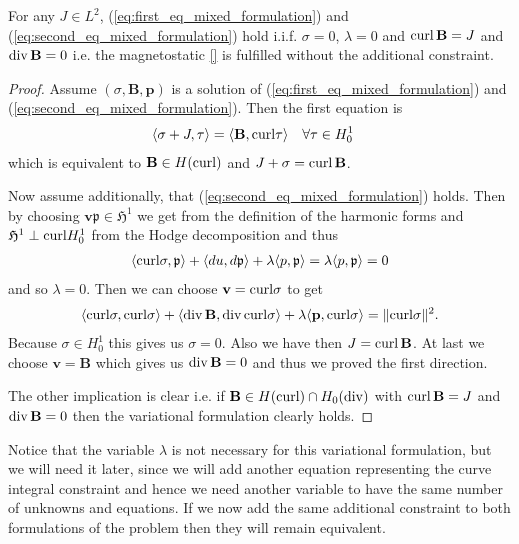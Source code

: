 \documentclass[../master_thesis.tex]{subfiles}
\begin{document}
\begin{proposition}
    For any $J \in L^2$, (\ref{eq:first_eq_mixed_formulation}) and 
    (\ref{eq:second_eq_mixed_formulation}) hold i.i.f. 
    $\sigma = 0$, $\lambda=0$ and $\operatorname{curl} \mathbf{B} = J$ and 
    $\operatorname{div} \mathbf{B} = 0$
    i.e. the magnetostatic \ref{}  is fulfilled without the additional 
    constraint.
\end{proposition}
\begin{proof}
    Assume $(\sigma,\mathbf{B},\mathbf{p})$ is a solution of (\ref{eq:first_eq_mixed_formulation}) and 
    (\ref{eq:second_eq_mixed_formulation}). Then the first equation is
    \begin{align*}
        \langle \sigma + J, \tau \rangle  
        &=  \langle \mathbf{B}, \mathbf{\operatorname{curl}}\tau \rangle  \quad \forall \tau \in H^1_0
    \end{align*}
    which is equivalent to $\mathbf{B} \in H(\operatorname{curl})$ and $J + \sigma = \operatorname{curl} \mathbf{B}$.

    Now assume additionally, that  
    (\ref{eq:second_eq_mixed_formulation}) holds. Then by choosing $\mathbf{v} \mathfrak{p} \in \mathfrak{H}^1$
    we get from the definition of the harmonic forms 
    and $\mathfrak{H}^1 \perp \mathbf{\operatorname{curl}} H^1_0$ from the Hodge decomposition and thus
    \begin{align*}
        \langle \mathbf{\operatorname{curl}} \sigma, \mathfrak{p} \rangle + \langle du, d\mathfrak{p} \rangle + \lambda\langle p, \mathfrak{p} \rangle
        = \lambda \langle p, \mathfrak{p} \rangle = 0
    \end{align*}
    and so $\lambda = 0$. Then we can choose $\mathbf{v} = \mathbf{\operatorname{curl}} \sigma$ to get 
    \begin{align*}
        \langle \mathbf{\operatorname{curl}} \sigma, \mathbf{\operatorname{curl}} \sigma \rangle + \langle \operatorname{div} \mathbf{B}, \operatorname{div} \mathbf{\operatorname{curl}} \sigma \rangle 
            + \lambda \langle \mathbf{p}, \mathbf{\operatorname{curl}} \sigma \rangle
        = \lVert \mathbf{\operatorname{curl}} \sigma \rVert^2.
    \end{align*}
    Because $\sigma \in H^1_0$ this gives us $\sigma = 0$. Also we have then 
    $J = \operatorname{curl} \mathbf{B}$. At last we choose $\mathbf{v} = \mathbf{B}$ which gives us 
    $\operatorname{div} \mathbf{B} = 0$ and thus we proved the first direction. 

    The other implication is clear i.e. if $\mathbf{B} \in H(\operatorname{curl}) \cap H_0(\operatorname{div})$
    with $\operatorname{curl} \mathbf{B} = J$ and $\operatorname{div} \mathbf{B} = 0$ then the variational 
    formulation clearly holds.
    \end{proof}
Notice that the variable $\lambda$ is not necessary for this variational formulation, 
but we will need it later, since we will add another equation representing the 
curve integral constraint and hence we need another variable to have the same 
number of unknowns and equations.
If we now add the same additional constraint to both formulations of the problem 
then they will remain equivalent.
\end{document}

